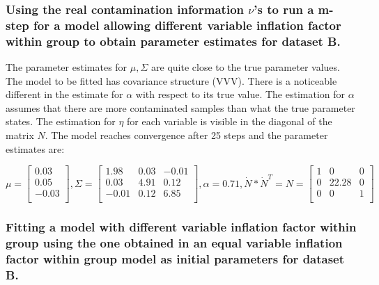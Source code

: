 \documentclass[
]{article}
\begin{document}
\hypertarget{using-the-real-contamination-information-nus-to-run-a-m-step-for-a-model-allowing-different-variable-inflation-factor-within-group-to-obtain-parameter-estimates-for-dataset-b.}{%
\subsubsection{\texorpdfstring{Using the real contamination information
\(\nu\)'s to run a m-step for a model allowing different variable
inflation factor within group to obtain parameter estimates for dataset
B.}{Using the real contamination information \textbackslash nu's to run a m-step for a model allowing different variable inflation factor within group to obtain parameter estimates for dataset B.}}\label{using-the-real-contamination-information-nus-to-run-a-m-step-for-a-model-allowing-different-variable-inflation-factor-within-group-to-obtain-parameter-estimates-for-dataset-b.}}

The parameter estimates for \(\mu,\Sigma\) are quite close to the true
parameter values. The model to be fitted has covariance structure (VVV).
There is a noticeable different in the estimate for \(\alpha\) with
respect to its true value. The estimation for \(\alpha\) assumes that
there are more contaminated samples than what the true parameter states.
The estimation for \(\eta\) for each variable is visible in the diagonal
of the matrix \(N\). The model reaches convergence after 25 steps and
the parameter estimates are:

\[
\mu = \begin{bmatrix}0.03 \\0.05 \\-0.03 \\\end{bmatrix} , \Sigma = \begin{bmatrix}1.98&0.03&-0.01 \\0.03&4.91&0.12 \\-0.01&0.12&6.85 \\\end{bmatrix} , \alpha = 0.71, \dot{N} * \dot{N}^{T} = N = \begin{bmatrix}1&0&0 \\0&22.28&0 \\0&0&1 \\\end{bmatrix}
\]

\hypertarget{fitting-a-model-with-different-variable-inflation-factor-within-group-using-the-one-obtained-in-an-equal-variable-inflation-factor-within-group-model-as-initial-parameters-for-dataset-b.}{%
\subsubsection{Fitting a model with different variable inflation factor
within group using the one obtained in an equal variable inflation
factor within group model as initial parameters for dataset
B.}\label{fitting-a-model-with-different-variable-inflation-factor-within-group-using-the-one-obtained-in-an-equal-variable-inflation-factor-within-group-model-as-initial-parameters-for-dataset-b.}}
\end{document}
